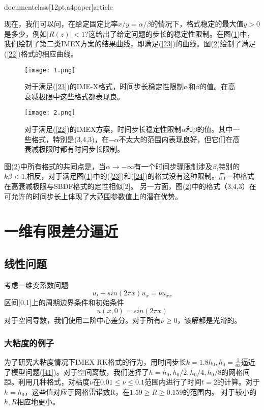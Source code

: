 \\documentclass[12pt,a4paper]{article}
\begin{document}
现在，我们可以问，在给定固定比率$x/y=\alpha/\beta$的情况下，格式稳定的最大值$y> 0$是多少，例如$|R(z)|<1$?这给出了给定问题的步长的稳定性限制。在图(\ref{figures1})中，我们绘制了第二类IMEX方案的结果曲线，即满足(\ref{23})的曲线。图(\ref{figures2})绘制了满足(\ref{22})格式的相应曲线。

\begin{figure}[H]
\texttt{[image: 1.png]}
\caption{对于满足(\ref{23})的IME-X格式，时间步长稳定性限制$\alpha$和$\beta$的值。在高衰减极限中这些格式都表现良。}
\centering
\label{figures1}
\end{figure}
\begin{figure}[H]
\texttt{[image: 2.png]}
\caption{对于满足(\ref{22})的IMEX方案，时间步长稳定性限制$\alpha$和$\beta$的值。其中一些格式，特别是(3,4,3)，在$-\alpha$不太大的范围内表现良好，但它们在高衰减极限时都有时间步长限制。}
\centering
\label{figures2}
\end{figure}

图(\ref{figures2})中所有格式的共同点是，当$\alpha\to -\infty$有一个时间步骤限制涉及$\beta$,特别的$k\beta<1$,相反，对于满足图(\ref{figures1})中的(\ref{23})和(\ref{24})的格式没有这种限制。后一种格式在高衰减极限与SBDF格式的定性相似[2]。 另一方面，图(\ref{figures2})中的格式（3,4,3）在可允许的时间步长上体现了大范围参数值上的潜在优势。

\section{一维有限差分逼近}
\subsection{线性问题}

考虑一维变系数问题
\begin{equation}
u_{t}+sin(2\pi x)u_{x}=\nu u_{xx}
\label{41}
\end{equation}
区间[0,1]上的周期边界条件和初始条件
\begin{equation*}
u(x,0)=sin(2\pi x)
\end{equation*}
对于空间导数，我们使用二阶中心差分。对于所有$\nu\ge 0$，该解都是光滑的。

\subsubsection{大粘度的例子}

为了研究大粘度情况下IMEX RK格式的行为，用时间步长$k=1.8h_{0},h_{0}=\frac{1}{63}$逼近了模型问题(\ref{41})。对于空间离散，我们选择了$h=h_{0},h_{0}/2,h_{0}/4,h_{0}/8$的网格间距。利用几种格式，对粘度$\nu$在$0.01\le \nu\le 0.1$范围内进行了时间$t=2$的计算。对于$h=h_{0}$，这些值对应于网格雷诺数R，在$1.59\ge R\ge 0.159$的范围内。 对于较小的$h,R$相应地更小。
\end{document}
